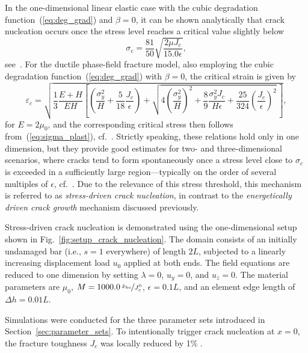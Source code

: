 \documentclass[pdflatex,sn-mathphys-num]{sn-jnl}%
\theoremstyle{thmstyleone}%
\theoremstyle{thmstyletwo}%
\theoremstyle{thmstylethree}%
\begin{document}
In the one-dimensional linear elastic case with the cubic degradation function~(\ref{eq:deg_grad}) and $\beta = 0$, it can be shown analytically that crack nucleation occurs once the stress level reaches a critical value slightly below
\begin{equation}
    \sigma_c = \dfrac{81}{50}\sqrt{\dfrac{2\mu J_c}{15.0\epsilon}},
    \label{eq:sig_c}
\end{equation}
see~\cite{schlueter_phase_2018}. For the ductile phase-field fracture model, also employing the cubic degradation function~(\ref{eq:deg_grad}) with $\beta = 0$, the critical strain is given by
\begin{equation}
    \varepsilon_c = \sqrt{\dfrac{1}{3} \dfrac{E+H}{EH}
    \left[\left(\dfrac{\sigma_y^2}{H} + \dfrac{5}{18}\dfrac{J_c}{\epsilon}\right)
    + \sqrt{4\left(\dfrac{\sigma_y^2}{H}\right)^2
    + \dfrac{8}{9} \dfrac{\sigma_y^2 J_c}{H\epsilon}
    + \dfrac{25}{324} \left(\dfrac{J_c}{\epsilon}\right)^2}\,\right]},
    \label{eq:ductile_fracture_strain}
\end{equation}
for $E = 2\mu_0$, and the corresponding critical stress then follows from~(\ref{eq:sigma_plast}), cf.~\cite{noll_3d_2020}. Strictly speaking, these relations hold only in one dimension, but they provide good estimates for two- and three-dimensional scenarios, where cracks tend to form spontaneously once a stress level close to $\sigma_c$ is exceeded in a sufficiently large region—typically on the order of several multiples of $\epsilon$, cf.~\cite{kuhn_numerical_2013}. Due to the relevance of this stress threshold, this mechanism is referred to as \textsl{stress-driven crack nucleation}, in contrast to the \textsl{energetically driven crack growth} mechanism discussed previously.

Stress-driven crack nucleation is demonstrated using the one-dimensional setup shown in Fig.~\ref{fig:setup_crack_nucleation}. The domain consists of an initially undamaged bar (i.e., $s = 1$ everywhere) of length $2L$, subjected to a linearly increasing displacement load $u_0$ applied at both ends. The field equations are reduced to one dimension by setting $\lambda = 0$, $u_y = 0$, and $u_z = 0$. The material parameters are $\mu_0$, $M = 1000.0\,\nicefrac{\dot{x}_{\text{bc}}}{J_c^0}$, $\epsilon = 0.1L$, and an element edge length of $\Delta h = 0.01L$.

Simulations were conducted for the three parameter sets introduced in Section~\ref{sec:parameter_sets}. To intentionally trigger crack nucleation at $x = 0$, the fracture toughness $J_c$ was locally reduced by 1\% .
\end{document}
